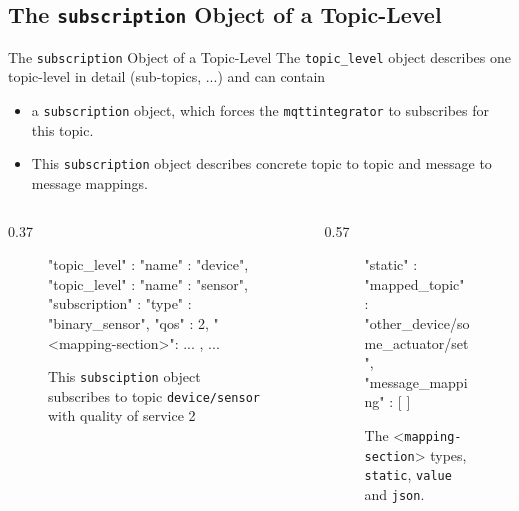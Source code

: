 ﻿\subsection{The \alert{\texttt{subscription}} Object of a \alert{Topic-Level}}

\begin{frame}[fragile]{The \texttt{\alert{subscription}} Object of a \alert{Topic-Level}}
  The \texttt{\textcolor{fh-ooe-red}{topic\_level}} object \alert{describes one topic-level in detail} (sub-topics, ...) and can contain
  \begin{itemize}
    \item a \texttt{\alert{subscription}} object, which forces the \texttt{\textcolor{fh-ooe-red}{mqttintegrator}} to subscribes for this topic.
    \item This \texttt{\alert{subscription}} object describes concrete \alert{topic to topic} and \alert{message to message} mappings.
  \end{itemize}
\begin{columns}[T]
\begin{column}{0.37\textwidth}
  \begin{figure}
  \begin{jsoncode}[autogobble=true]
        "topic_level" : {
            "name" : "device",
            "topic_level" : {
                "name" : "sensor",
                "subscription" : {
                    "type" : "binary_sensor",
                    "qos" : 2,
                    "<mapping-section>": {
                        ...
                    }
                },
                ...
            }
        }
  \end{jsoncode}
  \caption{This \alert{\texttt{subsciption}} object \alert{subscribes} to topic \textcolor{fh-ooe-red}{\texttt{device/sensor}} with \alert{quality of service} 2}
  \end{figure}
  \end{column}
  \begin{column}{0.57\textwidth}
  \begin{figure}
  \begin{jsoncode}[autogobble=true]
    "static" : {
        "mapped_topic" : "other_device/some_actuator/set",
        "message_mapping" : [{
        }]
    }
  \end{jsoncode}
  \caption{The <\textcolor{fh-ooe-red}{\texttt{mapping-section}}> types, \alert{\texttt{static}}, \alert{\texttt{value}} and \alert{\texttt{json}}.}
  \end{figure}
  \end{column}
\end{columns}
\end{frame}


